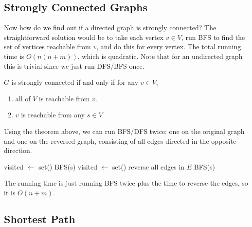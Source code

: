 \documentclass{article}
\begin{document}
  \subsection{Strongly Connected Graphs}

    Now how do we find out if a directed graph is strongly connected? The straightforward solution would be to take each vertex $v \in V$, run BFS to find the set of vertices reachable from $v$, and do this for every vertex. The total running time is $O(n(n+m))$, which is quadratic. Note that for an undirected graph this is trivial since we just run DFS/BFS once. 

    \begin{theorem}
      $G$ is strongly connected if and only if for any $v \in V$, 
      \begin{enumerate}
        \item all of $V$ is reachable from $v$. 
        \item $v$ is reachable from any $s \in V$
      \end{enumerate}
    \end{theorem}

    \begin{algo}
      Using the theorem above, we can run BFS/DFS twice: one on the original graph and one on the reversed graph, consisting of all edges directed in the opposite direction. 
      \begin{algorithm}[H]
        \label{alg:strongly_connected}
        \begin{algorithmic}[1]
            \State visited $\gets$ set() 
            \State BFS(s) 
              \State {}
            \EndIf
            \State visited $\gets$ set() 
            \State reverse all edges in $E$ 
            \State BFS(s) 
              \State {}
            \EndIf
            \State {}
          \EndFunction
        \end{algorithmic}
      \end{algorithm}
      The running time is just running BFS twice plus the time to reverse the edges, so it is $O(n+m)$. 
    \end{algo}

  \subsection{Shortest Path}
\end{document}
